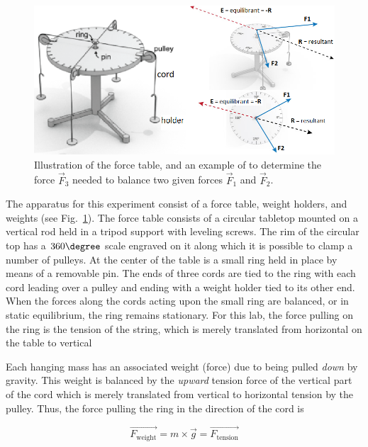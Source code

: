 \begin{figure}[h]
  \begin{center}
    \includegraphics[width=5.5in]{Fall/Experiment01Figures/M1_ForceTable_06_table.png}
  \end{center}
  \caption{Illustration of the force table, and an example of to determine the force $\vec{F}_{3}$ needed to balance two given forces $\vec{F}_{1}$ and $\vec{F}_{2}$.}
  \label{M01Fig06}
\end{figure}

The apparatus for this experiment consist of a force table, weight holders, and weights (see Fig.~\ref{M01Fig06}).  The force table consists of a circular tabletop mounted on a vertical rod held in a tripod support with leveling screws.  The rim of the circular top has a $360\degree$ scale engraved on it along which it is possible to clamp a number of pulleys.  At the center of the table is a small ring held in place by means of a removable pin.  The ends of three cords are tied to the ring with each cord leading over a pulley and ending with a weight holder tied to its other end. When the forces along the cords acting upon the small ring are balanced, or in static equilibrium, the ring remains stationary. For this lab, the force pulling on the ring is the tension of the string, which is merely translated from horizontal on the table to vertical 


Each hanging mass has an associated weight (force) due to being pulled \textit{down} by gravity. This weight is balanced by the \textit{upward }tension force of the vertical part of the cord which is merely translated from vertical to horizontal tension by the pulley. Thus, the force pulling the ring in the direction of the cord is

\begin{equation}
  \label{eq:M01_ForceG}
  \vec{F_\text{weight}} = m \times \vec{g} = \vec{F_\text{tension}}
\end{equation}


